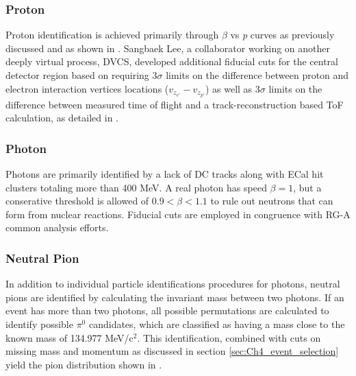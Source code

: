     

    
    \subsubsection*{Proton}
        Proton identification is achieved primarily through $\beta$ vs \textit{p} curves as previously discussed and as shown in . Sangbaek Lee, a collaborator working on another deeply virtual process, DVCS, developed additional fiducial cuts for the central detector region based on requiring 3$\sigma$ limits on the difference between proton and electron interaction vertices locations ($v_{z_{e'}} - v_{z_{p'}}$) as well as 3$\sigma$ limits on the difference between measured time of flight and a track-reconstruction based ToF calculation, as detailed in \parencite{Lee2022MeasurementDetector}.

    
    \subsubsection*{Photon}
        Photons are primarily identified by a lack of DC tracks along with ECal hit clusters totaling more than 400 MeV. A real photon has speed $\beta=1$, but a conserative threshold is allowed of $0.9<\beta<1.1$ to rule out neutrons that can form from nuclear reactions. Fiducial cuts are employed in congruence with RG-A common analysis efforts. 
    
        
    \subsubsection*{Neutral Pion}
        In addition to individual particle identifications procedures for photons, neutral pions are identified by calculating the invariant mass between two photons. If an event has more than two photons, all possible permutations are calculated to identify possible $\pi^0$ candidates, which are classified as having a mass close to the known mass of 134.977 MeV/c$^2$. This identification, combined with cuts on missing mass and momentum as discussed in section \ref{sec:Ch4_event_selection} yield the pion distribution shown in . 
        
